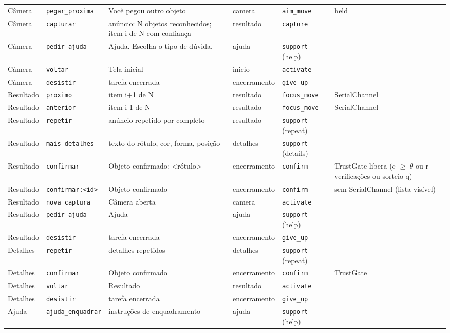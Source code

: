 \documentclass[a4paper,10pt]{article}
\begin{document}
\begin{longtable}{l l L{7.5cm} L{2.6cm} L{3.4cm} L{5.2cm}}
Câmera & \texttt{pegar\_proxima} & Você pegou outro objeto & camera & \texttt{aim\_move} & held\\
Câmera & \texttt{capturar} & anúncio: N objetos reconhecidos; item i de N com confiança & resultado & \texttt{capture} & \\
Câmera & \texttt{pedir\_ajuda} & Ajuda. Escolha o tipo de dúvida. & ajuda & \texttt{support} (help) & \\
Câmera & \texttt{voltar} & Tela inicial & inicio & \texttt{activate} & \\
Câmera & \texttt{desistir} & tarefa encerrada & encerramento & \texttt{give\_up} & \\
Resultado & \texttt{proximo} & item i+1 de N & resultado & \texttt{focus\_move} & SerialChannel\\
Resultado & \texttt{anterior} & item i-1 de N & resultado & \texttt{focus\_move} & SerialChannel\\
Resultado & \texttt{repetir} & anúncio repetido por completo & resultado & \texttt{support} (repeat) & \\
Resultado & \texttt{mais\_detalhes} & texto do rótulo, cor, forma, posição & detalhes & \texttt{support} (details) & \\
Resultado & \texttt{confirmar} & Objeto confirmado: <rótulo> & encerramento & \texttt{confirm} & TrustGate libera (c $\geq$ $\theta$ ou r verificações ou sorteio q)\\
Resultado & \texttt{confirmar:<id>} & Objeto confirmado & encerramento & \texttt{confirm} & sem SerialChannel (lista visível)\\
Resultado & \texttt{nova\_captura} & Câmera aberta & camera & \texttt{activate} & \\
Resultado & \texttt{pedir\_ajuda} & Ajuda & ajuda & \texttt{support} (help) & \\
Resultado & \texttt{desistir} & tarefa encerrada & encerramento & \texttt{give\_up} & \\
Detalhes & \texttt{repetir} & detalhes repetidos & detalhes & \texttt{support} (repeat) & \\
Detalhes & \texttt{confirmar} & Objeto confirmado & encerramento & \texttt{confirm} & TrustGate\\
Detalhes & \texttt{voltar} & Resultado & resultado & \texttt{activate} & \\
Detalhes & \texttt{desistir} & tarefa encerrada & encerramento & \texttt{give\_up} & \\
Ajuda & \texttt{ajuda\_enquadrar} & instruções de enquadramento & ajuda & \texttt{support} (help) & \\

\end{longtable}
\end{document}
